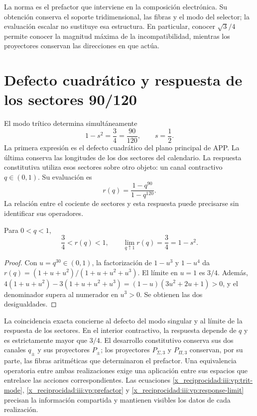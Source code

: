 La norma es el prefactor que interviene en la composición electrónica.
Su obtención conserva el soporte tridimensional, las fibras y el modo
del selector; la evaluación escalar no sustituye esa estructura. En
particular, conocer $\sqrt3/4$ permite conocer la magnitud máxima de
la incompatibilidad, mientras los proyectores conservan las direcciones
en que actúa.

\clearpage
\section{Defecto cuadrático y respuesta de los sectores 90/120}

El modo trítico determina simultáneamente
\begin{equation}
 1-s^2=\frac34=\frac{90}{120},\qquad s=\frac12.
 \label{x_reciprocidad:iii:vp:defect-ratio}
\end{equation}
La primera expresión es el defecto cuadrático del plano principal de APP.
La última conserva las longitudes de los dos sectores del calendario.
La respuesta constitutiva utiliza esos sectores sobre otro objeto: un
canal contractivo $q\in(0,1)$. Su evaluación es
\[
 r(q)=\frac{1-q^{90}}{1-q^{120}}.
\]
La relación entre el cociente de sectores y esta respuesta puede
precisarse sin identificar sus operadores.

\begin{proposition}
Para $0<q<1$,
\begin{equation}
 \frac34<r(q)<1,\qquad
 \lim_{q\uparrow1}r(q)=\frac34=1-s^2.
 \label{x_reciprocidad:iii:vp:response-limit}
\end{equation}
\end{proposition}
\begin{proof}
Con $u=q^{30}\in(0,1)$, la factorización de $1-u^3$ y
$1-u^4$ da
$r(q)=(1+u+u^2)/(1+u+u^2+u^3)$. El límite en $u=1$ es
$3/4$. Además,
$4(1+u+u^2)-3(1+u+u^2+u^3)
=(1-u)(3u^2+2u+1)>0$, y el denominador supera al numerador
en $u^3>0$. Se obtienen las dos desigualdades.
\end{proof}

La coincidencia exacta concierne al defecto del modo singular y al límite
de la respuesta de los sectores. En el interior contractivo, la respuesta
depende de $q$ y es estrictamente mayor que $3/4$. El desarrollo
constitutivo conserva sus dos canales $q_\pm$ y sus proyectores
$P_\pm$; los proyectores $P_{\Sigma,3}$ y $P_{\Pi,3}$ conservan,
por su parte, las fibras aritméticas que determinaron el prefactor.
Una equivalencia operatoria entre ambas realizaciones exige una aplicación
entre sus espacios que entrelace las acciones correspondientes.
Las ecuaciones \eqref{x_reciprocidad:iii:vp:trit-mode}, \eqref{x_reciprocidad:iii:vp:prefactor} y
\eqref{x_reciprocidad:iii:vp:response-limit} precisan la información compartida y
mantienen visibles los datos de cada realización.

